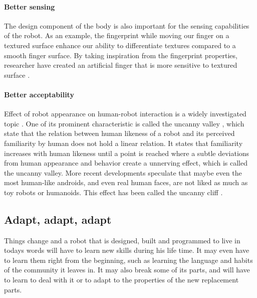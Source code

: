 \paragraph{Better sensing} The design component of the body is also important for the sensing capabilities of the robot. As an example, the fingerprint while moving our finger on a textured surface enhance our ability to differentiate textures \cite{hollins2010somesthetic} compared to a smooth finger surface. By taking inspiration from the fingerprint properties, researcher have created an artificial finger that is more sensitive to textured surface \cite{candelier2011role}.

\paragraph{Better acceptability}

Effect of robot appearance on human-robot interaction is a widely investigated topic \cite{li2010cross, heerink2006studying}. One of its prominent characteristic is called the uncanny valley \cite{mori1970uncanny}, which state that the relation between human likeness of a robot and its perceived familiarity by human does not hold a linear relation. It states that familiarity increases with human likeness until a point is reached where a subtle deviations from human appearance and behavior create a unnerving effect, which is called the uncanny valley. More recent developments speculate that maybe even the most human-like androids, and even real human faces, are not liked as much as toy robots or humanoids. This effect has been called the uncanny cliff \cite{bartneck2007uncanny}.

\subsection{Adapt, adapt, adapt}


Things change and a robot that is designed, built and programmed to live in todays words will have to learn new skills during his life time. It may even have to learn them right from the beginning, such as learning the language and habits of the community it leaves in. It may also break some of its parts, and will have to learn to deal with it or to adapt to the properties of the new replacement parts.

